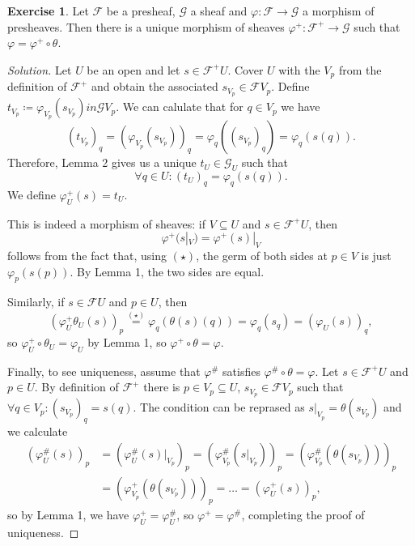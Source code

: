 \documentclass[a4paper]{amsbook}
\theoremstyle{definition}
\newtheorem*{exercise*}{Exercise}
\begin{document}
\begin{exercise*}
\label{Factor}
Let $\mathcal{F}$ be a presheaf, $\mathcal{G}$ a sheaf and $\varphi\colon \mathcal{F}\to \mathcal{G}$
a morphism of presheaves. Then there is a unique morphism of sheaves
$\varphi^+\colon \mathcal{F}^+\to \mathcal{G}$ such that $\varphi = \varphi^+ \circ \theta$.
\end{exercise*}
\begin{proof}[Solution]
Let $U$ be an open and let $s \in \mathcal{F}^+U$.
Cover $U$ with the $V_p$ from the definition of $\mathcal{F}^+$
and obtain the associated $s_{V_p} \in \mathcal{F}V_p$. Define
$t_{V_p} \coloneqq \varphi_{V_p}(s_{V_p}) in \mathcal{G}V_p$. We can calulate that
for $q \in V_p$ we have
\[ (t_{V_p})_q = (\varphi_{V_p}(s_{V_p}))_q = \varphi_q((s_{V_p})_q) = \varphi_q(s(q)). \]
Therefore, Lemma 2 gives us a unique $t_U \in \mathcal{G}_U$ such that
\begin{equation}\tag{$\star$}
	\forall q \in U\colon (t_U)_q = \varphi_q(s(q)).
\end{equation}
We define $\varphi^+_U(s) = t_U$.

This is indeed a morphism of sheaves: if $V \subseteq U$ and $s \in \mathcal{F}^+U$,
then
\[ \varphi^+(s|_V) = \varphi^+(s)|_V \]
follows from the fact that, using $(\star)$, the germ of both sides at $p \in V$
is just $\varphi_p(s(p))$. By Lemma 1, the two sides are equal.

Similarly, if $s \in \mathcal{F}U$ and $p \in U$, then
\[ (\varphi^+_U\theta_U(s))_p \stackrel{(\star)}{=} \varphi_q(\theta(s)(q)) = \varphi_q(s_q) = (\varphi_U(s))_q, \]
so $\varphi^+_U \circ \theta_U = \varphi_U$ by Lemma 1, so
$\varphi^+ \circ \theta = \varphi$.

Finally, to see uniqueness, assume that $\varphi^\#$ satisfies
 $\varphi^\# \circ \theta = \varphi$. Let $s \in \mathcal{F}^+U$ and $p \in U$.
By definition of $\mathcal{F}^+$ there is $p \in V_p \subseteq U$, $s_{V_p} \in \mathcal{F}V_p$
such that $\forall q \in V_p\colon (s_{V_p})_q = s(q)$. The condition can be
reprased as $s|_{V_p} = \theta(s_{V_p})$ and we calculate
\begin{align*}
	(\varphi^\#_U(s))_p &= (\varphi_U^\#(s)|_{V_p})_p
= (\varphi_{V_p}^\#(s|_{V_p}))_p
= (\varphi_{V_p}^\#(\theta(s_{V_p})))_p\\
	&= (\varphi_{V_p}^+(\theta(s_{V_p})))_p = \ldots = (\varphi^+_U(s))_p,
\end{align*}
so by Lemma 1, we have $\varphi^+_U = \varphi^\#_U$, so $\varphi^+ = \varphi^\#$,
completing the proof of uniqueness.
\end{proof}
\end{document}
